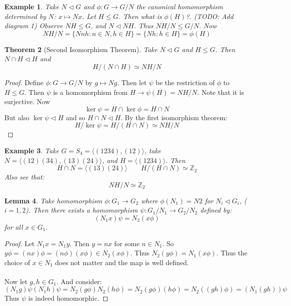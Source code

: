 \documentclass[a4paper,10pt]{article}
\newcommand{\ZZ}{\mathbb{Z}}
\newtheorem{thm}{Theorem}
\newtheorem{eg}[thm]{Example}
\newtheorem{Lem}[thm]{Lemma}
\begin{document}
\begin{eg}
Take $N \triangleleft G$ and $\phi: G \rightarrow G / N$ the canonical homomorphism determined by $N$: $x \mapsto Nx$. Let $H \leq G$. Then what is $\phi(H)$?.
(TODO: Add diagram 1)
Observe $NH \leq G$, and $N \triangleleft NH$. Thus $NH / N \leq G / N$. Now
\[ NH / N = \{ Nnh : n \in N, h \in H \} = \{ Nh : h \in H \} = \phi(H) \]
\end{eg}

\begin{thm}[Second Isomorphism Theorem]
Take $N \triangleleft G$ and $H \leq G$. Then $N \cap H \triangleleft H$ and 
\[ H / (N \cap H) \simeq NH / N \]
\end{thm}

\begin{proof}
Define $\phi : G \rightarrow G / N$ by $g \mapsto Ng$. Then let $\psi$ be the restriction of $\phi$ to $H \leq G$. Then $\psi$ is a homomorphism from $H \rightarrow \psi(H) = NH / N$. Note that it is surjective. Now 
\[ \ker \psi = H \cap \ker \phi = H \cap N \]
But also $\ker \psi \triangleleft H$ and so $H \cap N \triangleleft H$. By the first isomorphism theorem:
\[ H / \ker \psi = H / (H \cap N) \simeq NH / N \]
\end{proof}

\begin{eg}
Take $G = S_4 = \langle (1234), (12) \rangle$, take $N = \langle (12)(34), (13)(24) \rangle$, and $H = \langle (1234) \rangle$. Then
\[ H \cap N = \langle (13)(24) \rangle \qquad H / (H \cap N) \simeq \ZZ_2 \]
Also see that:
\[NH / N \simeq \ZZ_2 \]
\end{eg}


\begin{Lem}
Take homomorphism $\phi : G_1 \rightarrow G_2$ where $\phi(N_1) = N2$ for $N_i \triangleleft G_i$, ($i = 1,2$). Then there exists a homomorphism $\psi : G_1 / N_1 \rightarrow G_2 / N_2$ defined by:
\[ (N_1x)\psi = N_2(x\phi) \]
for all $x \in G_1$.   
\end{Lem}

\begin{proof}
Let $N_1 x = N_1 y$. Then $y = nx$ for some $n \in N_1$. So $y \phi = (nx)\phi = (n\phi)(x\phi) \in N_2 (x\phi)$. Thus $N_2(y\phi) = N_1(x\phi)$. Thus the choice of $x \in N_1$ does not matter and the map is well defined. \\
\\
Now let $g,h \in G_1$. And consider:
\[ (N_1 g)\psi (N_1 h)\psi = N_2(g\phi) N_2(h\phi) = N_2(g\phi)(h\phi) = N_2((gh)\phi) = (N_1(gh))\psi \]
Thus $\psi$ is indeed homomorphic. 
\end{proof}
\end{document}
